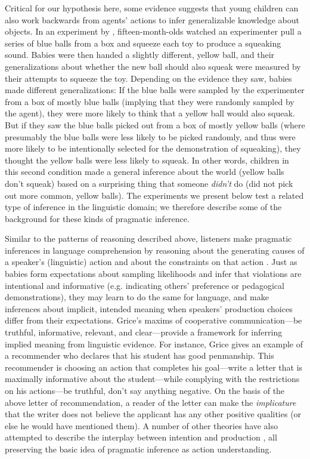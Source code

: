 \documentclass[man]{apa2}
\begin{document}
Critical for our hypothesis here, some evidence suggests that young children can also work backwards from agents' actions to infer generalizable knowledge about objects. In an experiment by , fifteen-month-olds watched an experimenter pull a series of blue balls from a box and squeeze each toy to produce a squeaking sound. Babies were then handed a slightly different, yellow ball, and their generalizations about whether the new ball should also squeak were measured by their attempts to squeeze the toy. Depending on the evidence they saw, babies made different generalizations: If the blue balls were sampled by the experimenter from a box of mostly blue balls (implying that they were randomly sampled by the agent), they were more likely to think that a yellow ball would also squeak. But if they saw the blue balls picked out from a box of mostly yellow balls (where presumably the blue balls were less likely to be picked randomly, and thus were more likely to be intentionally selected for the demonstration of squeaking), they thought the yellow balls were less likely to squeak. In other words, children in this second condition made a general inference about the world (yellow balls don't squeak) based on a surprising thing that someone \emph{didn't} do (did not pick out more common, yellow balls). The experiments we present below test a related type of inference in the linguistic domain; we therefore describe some of the background for these kinds of pragmatic inference. 


Similar to the patterns of reasoning described above, listeners make pragmatic inferences in language comprehension by reasoning about the generating causes of a speaker's (linguistic) action and about the constraints on that action \cite{shafto2012}. Just as babies form expectations about sampling likelihoods and infer that violations are intentional and informative (e.g. indicating others' preference or pedagogical demonstrations), they may learn to do the same for language, and make inferences about implicit, intended meaning when speakers' production choices differ from their expectations. Grice's \citeyear{grice1975} maxims of cooperative communication---be truthful, informative, relevant, and clear---provide a framework for inferring implied meaning from linguistic evidence. For instance, Grice gives an example of a recommender who declares that his student has good penmanship. This recommender is choosing an action that completes his goal---write a letter that is maximally informative about the student---while complying with the restrictions on his actions---be truthful, don't say anything negative. On the basis of the above letter of recommendation, a reader of the letter can make the \emph{implicature} that the writer does not believe the applicant has any other positive qualities (or else he would have mentioned them). A number of other theories have also attempted to describe the interplay between intention and production \cite{horn1984,clark1996,levinson2000}, all preserving the basic idea of pragmatic inference as action understanding. 
\end{document}

